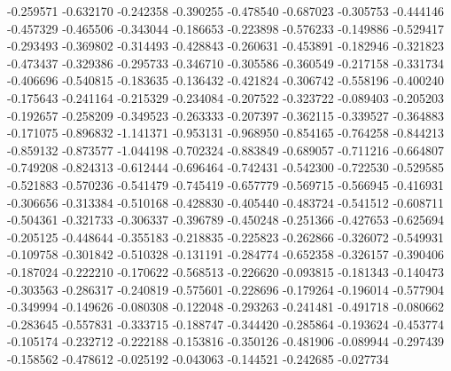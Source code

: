 -0.259571
-0.632170
-0.242358
-0.390255
-0.478540
-0.687023
-0.305753
-0.444146
-0.457329
-0.465506
-0.343044
-0.186653
-0.223898
-0.576233
-0.149886
-0.529417
-0.293493
-0.369802
-0.314493
-0.428843
-0.260631
-0.453891
-0.182946
-0.321823
-0.473437
-0.329386
-0.295733
-0.346710
-0.305586
-0.360549
-0.217158
-0.331734
-0.406696
-0.540815
-0.183635
-0.136432
-0.421824
-0.306742
-0.558196
-0.400240
-0.175643
-0.241164
-0.215329
-0.234084
-0.207522
-0.323722
-0.089403
-0.205203
-0.192657
-0.258209
-0.349523
-0.263333
-0.207397
-0.362115
-0.339527
-0.364883
-0.171075
-0.896832
-1.141371
-0.953131
-0.968950
-0.854165
-0.764258
-0.844213
-0.859132
-0.873577
-1.044198
-0.702324
-0.883849
-0.689057
-0.711216
-0.664807
-0.749208
-0.824313
-0.612444
-0.696464
-0.742431
-0.542300
-0.722530
-0.529585
-0.521883
-0.570236
-0.541479
-0.745419
-0.657779
-0.569715
-0.566945
-0.416931
-0.306656
-0.313384
-0.510168
-0.428830
-0.405440
-0.483724
-0.541512
-0.608711
-0.504361
-0.321733
-0.306337
-0.396789
-0.450248
-0.251366
-0.427653
-0.625694
-0.205125
-0.448644
-0.355183
-0.218835
-0.225823
-0.262866
-0.326072
-0.549931
-0.109758
-0.301842
-0.510328
-0.131191
-0.284774
-0.652358
-0.326157
-0.390406
-0.187024
-0.222210
-0.170622
-0.568513
-0.226620
-0.093815
-0.181343
-0.140473
-0.303563
-0.286317
-0.240819
-0.575601
-0.228696
-0.179264
-0.196014
-0.577904
-0.349994
-0.149626
-0.080308
-0.122048
-0.293263
-0.241481
-0.491718
-0.080662
-0.283645
-0.557831
-0.333715
-0.188747
-0.344420
-0.285864
-0.193624
-0.453774
-0.105174
-0.232712
-0.222188
-0.153816
-0.350126
-0.481906
-0.089944
-0.297439
-0.158562
-0.478612
-0.025192
-0.043063
-0.144521
-0.242685
-0.027734
